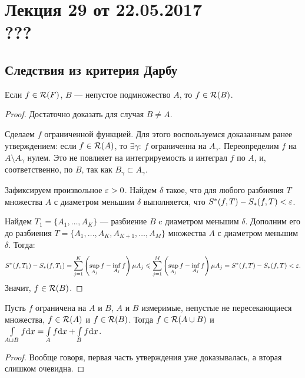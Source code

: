 \section{Лекция 29 от 22.05.2017 \\ ???}

\subsection{Следствия из критерия Дарбу}

\begin{Statement}
Если $f \in \mathcal{R}(F)$, $B$ --- непустое подмножество $A$, то $f \in \mathcal{R}(B)$.
\end{Statement}
\begin{proof}
Достаточно доказать для случая $B \neq A$.

Сделаем $f$ ограниченной функцией. Для этого воспользуемся доказанным ранее утверждением: если $f \in \mathcal{R}(A)$, то $\exists \gamma:\ f$ ограниченна на $A_\gamma$. Переопределим $f$ на $A \setminus A_\gamma$ нулем. Это не повлияет на интегрируемость и интеграл $f$ по $A$, и, соответственно, по $B$, так как $B_\gamma \subset A_\gamma$.

Зафиксируем произвольное $\varepsilon > 0$. Найдем $\delta$ такое, что для любого разбиения $T$ множества $A$ с диаметром меньшим $\delta$ выполняется, что $S^*(f, T) - S_*(f, T) < \varepsilon$.

Найдем $T_1 = \{ A_1, \ldots, A_K \}$ --- разбиение $B$ c диаметром меньшим $\delta$. Дополним его до разбиения $T = \{ A_1, \ldots, A_K, A_{K+1}, \ldots, A_M \}$ множества $A$ с диаметром меньшим $\delta$. Тогда:
\begin{gather*}
S^*(f, T_1) - S_*(f, T_1) = \sum\limits_{j = 1}^K\left( \sup\limits_{A_j}f - \inf\limits_{A_j}f \right)\mu A_j \leqslant \sum\limits_{j = 1}^M\left( \sup\limits_{A_j}f - \inf\limits_{A_j}f \right)\mu A_j = S^*(f, T) - S_*(f, T) < \varepsilon.
\end{gather*}
Значит, $f \in \mathcal{R}(B)$.
\end{proof}

\begin{Statement}
Пусть $f$ ограничена на $A$ и $B$, $A$ и $B$ измеримые, непустые не пересекающиеся множества, $f \in \mathcal{R}(A)$ и $f \in \mathcal{R}(B)$. Тогда $f \in \mathcal{R}(A \cup B)$ и $\int\limits_{A \sqcup B}f \mathrm{d} x = \int\limits_A f \mathrm{d} x + \int\limits_B f \mathrm{d} x$.
\end{Statement}
\begin{proof}
Вообще говоря, первая часть утверждения уже доказывалась, а вторая слишком очевидна.
\end{proof}

